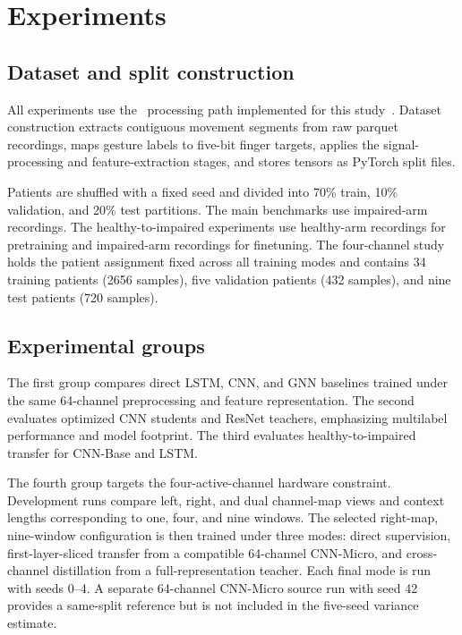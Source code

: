 \section{Experiments}

\subsection{Dataset and split construction}

All experiments use the \physiomio\ processing path implemented for this study~\citep{physiomioData2026,psrrepo2026}. Dataset construction extracts contiguous movement segments from raw parquet recordings, maps gesture labels to five-bit finger targets, applies the signal-processing and feature-extraction stages, and stores tensors as PyTorch split files.

Patients are shuffled with a fixed seed and divided into 70\% train, 10\% validation, and 20\% test partitions. The main benchmarks use impaired-arm recordings. The healthy-to-impaired experiments use healthy-arm recordings for pretraining and impaired-arm recordings for finetuning. The four-channel study holds the patient assignment fixed across all training modes and contains 34 training patients (2656 samples), five validation patients (432 samples), and nine test patients (720 samples).

\subsection{Experimental groups}

The first group compares direct LSTM, CNN, and GNN baselines trained under the same 64-channel preprocessing and feature representation. The second evaluates optimized CNN students and ResNet teachers, emphasizing multilabel performance and model footprint. The third evaluates healthy-to-impaired transfer for CNN-Base and LSTM.

The fourth group targets the four-active-channel hardware constraint. Development runs compare left, right, and dual channel-map views and context lengths corresponding to one, four, and nine windows. The selected right-map, nine-window configuration is then trained under three modes: direct supervision, first-layer-sliced transfer from a compatible 64-channel CNN-Micro, and cross-channel distillation from a full-representation teacher. Each final mode is run with seeds 0--4. A separate 64-channel CNN-Micro source run with seed 42 provides a same-split reference but is not included in the five-seed variance estimate.

